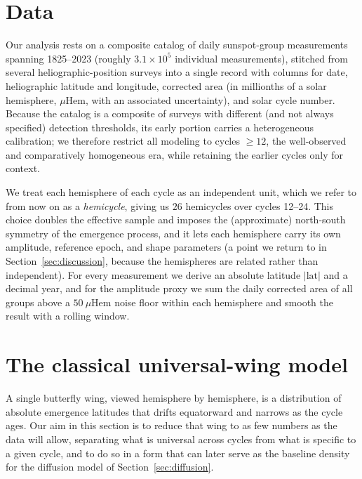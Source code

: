 \documentclass[twocolumn]{aastex631}
\newcommand{\msh}{\ensuremath{\mu\mathrm{Hem}}}   %
\begin{document}
\section{Data}
\label{sec:data}

Our analysis rests on a composite catalog of daily sunspot-group measurements
spanning 1825--2023 (roughly $3.1\times10^{5}$ individual measurements), stitched
from several heliographic-position surveys into a single record with columns for
date, heliographic latitude and longitude, corrected area (in millionths of a
solar hemisphere, \msh, with an associated uncertainty), and solar cycle number.
Because the catalog is a composite of surveys with different (and not always
specified) detection thresholds, its early portion carries a heterogeneous
calibration; we therefore restrict all modeling to cycles $\geq 12$, the
well-observed and comparatively homogeneous era, while retaining the earlier
cycles only for context.

We treat each hemisphere of each cycle as an independent unit, which we refer to
from now on as a \emph{hemicycle}, giving us $26$ hemicycles over cycles 12--24.
This choice doubles the effective sample and imposes the (approximate)
north-south symmetry of the emergence process, and it lets each hemisphere carry
its own amplitude, reference epoch, and shape parameters (a point we return to in
Section~\ref{sec:discussion}, because the hemispheres are related rather than
independent). For every measurement we derive an absolute latitude
$|\mathrm{lat}|$ and a decimal year, and for the amplitude proxy we sum the daily
corrected area of all groups above a $50~\msh$ noise floor within each
hemisphere and smooth the result with a rolling window.

\section{The classical universal-wing model}
\label{sec:classical}

A single butterfly wing, viewed hemisphere by hemisphere, is a distribution of
absolute emergence latitudes that drifts equatorward and narrows as the cycle
ages. Our aim in this section is to reduce that wing to as few numbers as the
data will allow, separating what is universal across cycles from what is
specific to a given cycle, and to do so in a form that can later serve as the
baseline density for the diffusion model of Section~\ref{sec:diffusion}.
\end{document}
